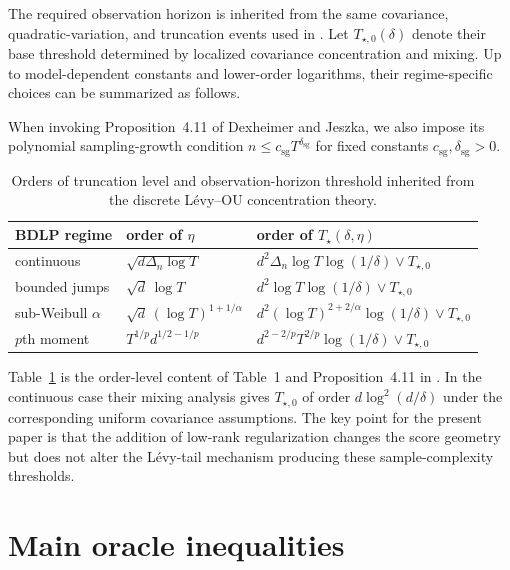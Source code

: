 \documentclass[12pt]{article}
\theoremstyle{definition}
\begin{document}
	The required observation horizon is inherited from the same covariance, quadratic-variation, and truncation events used in \citet{DexheimerJeszka2026}. Let $T_{\star,0}(\delta)$ denote their base threshold determined by localized covariance concentration and mixing. Up to model-dependent constants and lower-order logarithms, their regime-specific choices can be summarized as follows.
	
	When invoking Proposition~4.11 of Dexheimer and Jeszka, we also impose its polynomial sampling-growth condition $n\le c_{\mathrm{sg}}T^{\delta_{\mathrm{sg}}}$ for fixed constants $c_{\mathrm{sg}},\delta_{\mathrm{sg}}>0$.
	
	\begin{table}[ht]
		\centering
		\caption{Orders of truncation level and observation-horizon threshold inherited from the discrete L\'evy--OU concentration theory.}
		\label{tab:regimes}
		\begin{tabular}{lll}
			\toprule
			BDLP regime & order of $\eta$ & order of $T_\star(\delta,\eta)$ \\
			\midrule
			continuous
			& $\sqrt{d\Delta_n\log T}$
			& $d^2\Delta_n\log T\log(1/\delta)\vee T_{\star,0}$ \\
			bounded jumps
			& $\sqrt d\,\log T$
			& $d^2\log T\log(1/\delta)\vee T_{\star,0}$ \\
			sub-Weibull $\alpha$
			& $\sqrt d\,(\log T)^{1+1/\alpha}$
			& $d^2(\log T)^{2+2/\alpha}\log(1/\delta)\vee T_{\star,0}$ \\
			$p$th moment
			& $T^{1/p}d^{1/2-1/p}$
			& $d^{2-2/p}T^{2/p}\log(1/\delta)\vee T_{\star,0}$ \\
			\bottomrule
		\end{tabular}
	\end{table}
	
	Table~\ref{tab:regimes} is the order-level content of Table~1 and Proposition~4.11 in \citet{DexheimerJeszka2026}. In the continuous case their mixing analysis gives $T_{\star,0}$ of order $d\log^2(d/\delta)$ under the corresponding uniform covariance assumptions. The key point for the present paper is that the addition of low-rank regularization changes the score geometry but does not alter the L\'evy-tail mechanism producing these sample-complexity thresholds.
	
	\section{Main oracle inequalities}
	\label{sec:main}
	
\end{document}
